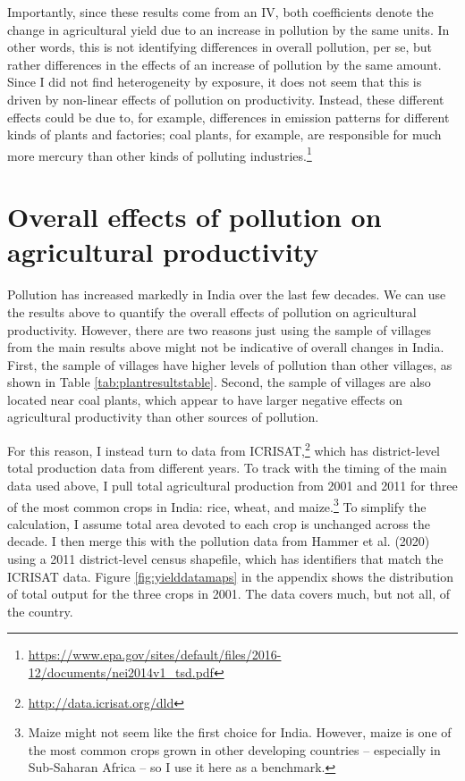 \documentclass[
]{article}
\begin{document}
Importantly, since these results come from an IV, both coefficients denote the change in agricultural yield due to an increase in pollution by the same units. In other words, this is not identifying differences in overall pollution, per se, but rather differences in the effects of an increase of pollution by the same amount. Since I did not find heterogeneity by exposure, it does not seem that this is driven by non-linear effects of pollution on productivity. Instead, these different effects could be due to, for example, differences in emission patterns for different kinds of plants and factories; coal plants, for example, are responsible for much more mercury than other kinds of polluting industries.\footnote{\url{https://www.epa.gov/sites/default/files/2016-12/documents/nei2014v1_tsd.pdf}}

\hypertarget{overall-effects-of-pollution-on-agricultural-productivity}{%
\section{Overall effects of pollution on agricultural productivity}\label{overall-effects-of-pollution-on-agricultural-productivity}}

Pollution has increased markedly in India over the last few decades. We can use the results above to quantify the overall effects of pollution on agricultural productivity. However, there are two reasons just using the sample of villages from the main results above might not be indicative of overall changes in India. First, the sample of villages have higher levels of pollution than other villages, as shown in Table \ref{tab:plantresultstable}. Second, the sample of villages are also located near coal plants, which appear to have larger negative effects on agricultural productivity than other sources of pollution.

For this reason, I instead turn to data from ICRISAT,\footnote{\url{http://data.icrisat.org/dld}} which has district-level total production data from different years. To track with the timing of the main data used above, I pull total agricultural production from 2001 and 2011 for three of the most common crops in India: rice, wheat, and maize.\footnote{Maize might not seem like the first choice for India. However, maize is one of the most common crops grown in other developing countries -- especially in Sub-Saharan Africa -- so I use it here as a benchmark.} To simplify the calculation, I assume total area devoted to each crop is unchanged across the decade. I then merge this with the pollution data from Hammer et al. (2020) using a 2011 district-level census shapefile, which has identifiers that match the ICRISAT data. Figure \ref{fig:yielddatamaps} in the appendix shows the distribution of total output for the three crops in 2001. The data covers much, but not all, of the country.
\end{document}
